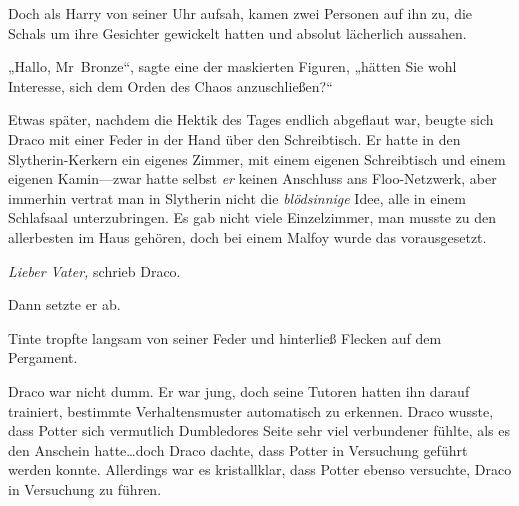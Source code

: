Doch als Harry von seiner Uhr aufsah, kamen zwei Personen auf ihn zu, die Schals um ihre Gesichter gewickelt hatten und absolut lächerlich aussahen.

„Hallo, Mr~Bronze“, sagte eine der maskierten Figuren, „hätten Sie wohl Interesse, sich dem Orden des Chaos anzuschließen?“


Etwas später, nachdem die Hektik des Tages endlich abgeflaut war, beugte sich Draco mit einer Feder in der Hand über den Schreibtisch. Er hatte in den Slytherin-Kerkern ein eigenes Zimmer, mit einem eigenen Schreibtisch und einem eigenen Kamin—zwar hatte selbst \emph{er} keinen Anschluss ans Floo-Netzwerk, aber immerhin vertrat man in Slytherin nicht die \emph{blödsinnige} Idee, alle in einem Schlafsaal unterzubringen. Es gab nicht viele Einzelzimmer, man musste zu den allerbesten im Haus gehören, doch bei einem Malfoy wurde das vorausgesetzt.

\emph{Lieber Vater,} schrieb Draco.

Dann setzte er ab.

Tinte tropfte langsam von seiner Feder und hinterließ Flecken auf dem Pergament.

Draco war nicht dumm. Er war jung, doch seine Tutoren hatten ihn darauf trainiert, bestimmte Verhaltensmuster automatisch zu erkennen. Draco wusste, dass Potter sich vermutlich Dumbledores Seite sehr viel verbundener fühlte, als es den Anschein hatte…doch Draco dachte, dass Potter in Versuchung geführt werden konnte. Allerdings war es kristallklar, dass Potter ebenso versuchte, Draco in Versuchung zu führen.

